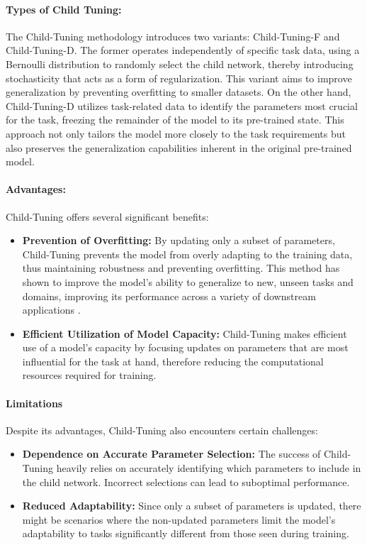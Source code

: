 \paragraph{Types of Child Tuning:} The Child-Tuning methodology introduces two variants: Child-Tuning-F and Child-Tuning-D. The former operates independently of specific task data, using a Bernoulli distribution to randomly select the child network, thereby introducing stochasticity that acts as a form of regularization. This variant aims to improve generalization by preventing overfitting to smaller datasets. On the other hand, Child-Tuning-D utilizes task-related data to identify the parameters most crucial for the task, freezing the remainder of the model to its pre-trained state. This approach not only tailors the model more closely to the task requirements but also preserves the generalization capabilities inherent in the original pre-trained model.

\paragraph{Advantages:} Child-Tuning offers several significant benefits:
\begin{itemize}
	\item \textbf{Prevention of Overfitting:} By updating only a subset of parameters, Child-Tuning prevents the model from overly adapting to the training data, thus maintaining robustness and preventing overfitting. This method has shown to improve the model's ability to generalize to new, unseen tasks and domains, improving its performance across a variety of downstream applications .
	\item \textbf{Efficient Utilization of Model Capacity:} Child-Tuning makes efficient use of a model's capacity by focusing updates on parameters that are most influential for the task at hand, therefore reducing the computational resources required for training.
\end{itemize}

\paragraph{Limitations}
Despite its advantages, Child-Tuning also encounters certain challenges:
\begin{itemize}
	\item \textbf{Dependence on Accurate Parameter Selection:} The success of Child-Tuning heavily relies on accurately identifying which parameters to include in the child network. Incorrect selections can lead to suboptimal performance.
	\item \textbf{Reduced Adaptability:} Since only a subset of parameters is updated, there might be scenarios where the non-updated parameters limit the model’s adaptability to tasks significantly different from those seen during training.
\end{itemize}

